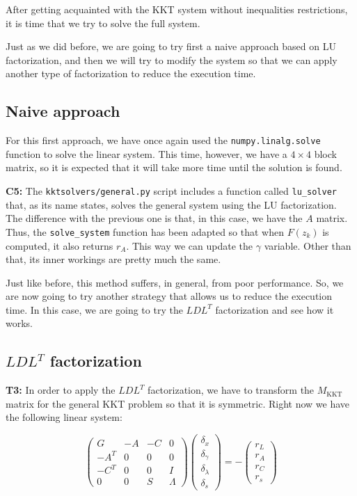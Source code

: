 \documentclass[11pt,a4paper]{article}
\begin{document}
After getting acquainted with the KKT system without inequalities restrictions, it is
time that we try to solve the full system.

Just as we did before, we are going to try first a naive approach based on LU factorization, and
then we will try to modify the system so that we can apply another type of factorization to reduce
the execution time.

\subsection{Naive approach}

For this first approach, we have once again used the \texttt{numpy.linalg.solve} function
to solve the linear system. This time, however, we have a $4 \times 4$ block matrix, so
it is expected that it will take more time until the solution is found.

\noindent \textbf{C5:} The \texttt{kktsolvers/general.py} script includes a function called
\texttt{lu\_solver} that, as its name states, solves the general system using the LU
factorization. The difference with the previous one is that, in this case, we have
the $A$ matrix. Thus, the \texttt{solve\_system} function has been adapted so that when
$F(z_k)$ is computed, it also returns $r_A$. This way we can update the $\gamma$ variable.
Other than that, its inner workings are pretty much the same.

Just like before, this method suffers, in general, from poor performance. So, we are now
going to try another strategy that allows us to reduce the execution time. In this case,
we are going to try the $LDL^T$ factorization and see how it works.

\subsection{$LDL^T$ factorization}

\noindent \textbf{T3:} In order to apply the $LDL^T$ factorization, we have to transform the
$M_{\text{KKT}}$ matrix for the general KKT problem so that it is symmetric. Right now we have the
following linear system:

\begin{equation}
  \label{eq:kkt-general-system}
  \begin{pmatrix}
    G & -A & -C & 0 \\
    -A^T & 0 & 0 & 0 \\
    -C^T & 0 & 0 & I \\
    0 & 0 & S & \Lambda
  \end{pmatrix}
  \begin{pmatrix}
    \delta_x \\
    \delta_\gamma \\
    \delta_\lambda \\
    \delta_s
  \end{pmatrix}
  =
  -
  \begin{pmatrix}
    r_L \\
    r_A \\
    r_C \\
    r_s
  \end{pmatrix}
\end{equation}
\end{document}
